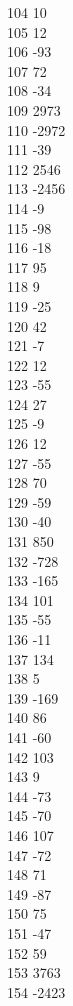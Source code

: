 { 104	10 \\
 105	12 \\
 106	-93 \\
 107	72 \\
 108	-34 \\
 109	2973 \\
 110	-2972 \\
 111	-39 \\
 112	2546 \\
 113	-2456 \\
 114	-9 \\
 115	-98 \\
 116	-18 \\
 117	95 \\
 118	9 \\
 119	-25 \\
 120	42 \\
 121	-7 \\
 122	12 \\
 123	-55 \\
 124	27 \\
 125	-9 \\
 126	12 \\
 127	-55 \\
 128	70 \\
 129	-59 \\
 130	-40 \\
 131	850 \\
 132	-728 \\
 133	-165 \\
 134	101 \\
 135	-55 \\
 136	-11 \\
 137	134 \\
 138	5 \\
 139	-169 \\
 140	86 \\
 141	-60 \\
 142	103 \\
 143	9 \\
 144	-73 \\
 145	-70 \\
 146	107 \\
 147	-72 \\
 148	71 \\
 149	-87 \\
 150	75 \\
 151	-47 \\
 152	59 \\
 153	3763 \\
 154	-2423 \\
}
